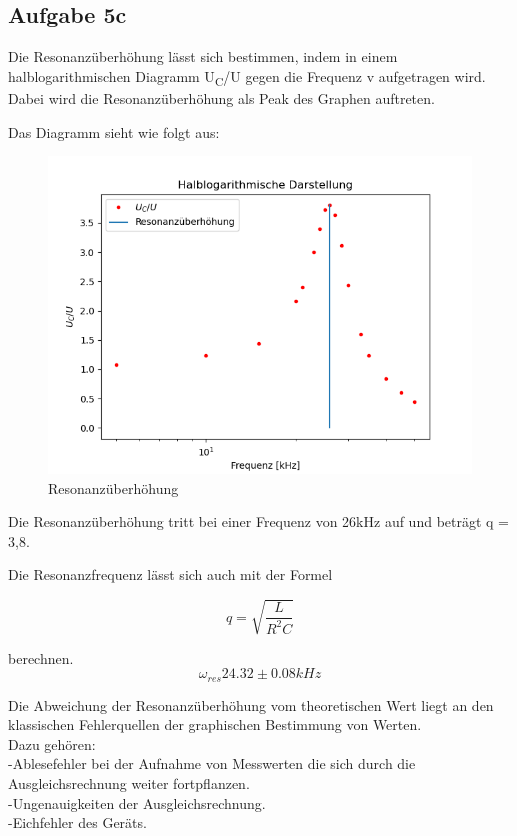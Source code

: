 \documentclass[titlepage=firstcover, captions=tableheading]{scrartcl}
\begin{document}
\subsection{Aufgabe 5c}

Die Resonanzüberhöhung lässt sich bestimmen,
indem in einem halblogarithmischen Diagramm U\textsubscript{C}/U gegen die Frequenz v aufgetragen wird.
Dabei wird die Resonanzüberhöhung als Peak des Graphen auftreten.

\noindent Das Diagramm sieht wie folgt aus:

\begin{figure}[H]
    \includegraphics{5c.png}
    \caption{Resonanzüberhöhung}
    \label{5bD}
\end{figure}

\noindent Die Resonanzüberhöhung tritt bei einer Frequenz von 26kHz auf und beträgt q = 3,8.


\noindent Die Resonanzfrequenz lässt sich auch mit der Formel 

\begin{displaymath}
    q = \sqrt{\frac{L}{R^2C}} 
\end{displaymath}

\noindent berechnen.
\begin{displaymath}
   \omega_{res} 24.32\pm 0.08  kHz
\end{displaymath}

\noindent Die Abweichung der Resonanzüberhöhung vom theoretischen Wert liegt an den klassischen Fehlerquellen der graphischen Bestimmung von Werten.\\
Dazu gehören:\\
-Ablesefehler bei der Aufnahme von Messwerten die sich durch die Ausgleichsrechnung weiter fortpflanzen.\\
-Ungenauigkeiten der Ausgleichsrechnung.\\
-Eichfehler des Geräts.\\
\end{document}
